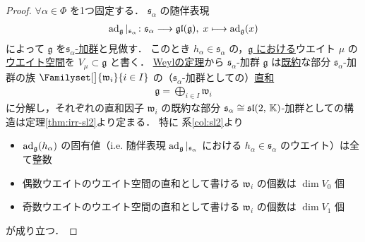 \documentclass[rep_main]{subfiles}
\begin{document}
\begin{proof}
	$\forall \alpha \in \Phi$ を1つ固定する．
	$\mathfrak{s}_\alpha$ の随伴表現
	\begin{align}
		\operatorname{ad}_{\mathfrak{g}}|_{\mathfrak{s}_\alpha} \colon \mathfrak{s}_\alpha \longrightarrow \mathfrak{gl} (\mathfrak{g}),\; x \longmapsto \operatorname{ad}_{\mathfrak{g}}(x)
	\end{align}
	によって $\mathfrak{g}$ を\hyperref[ax:g-module]{$\mathfrak{s}_\alpha$-加群}と見做す．
	このとき $h_\alpha \in \mathfrak{s}_\alpha$ の，\underline{$\mathfrak{g}$ における}ウエイト $\mu$ の\hyperref[def:weight-space]{ウエイト空間}を $V_\mu \subset \mathfrak{g}$ と書く．
	\hyperref[thm:Weyl]{Weylの定理}から $\mathfrak{s}_\alpha$-加群 $\mathfrak{g}$ は\hyperref[def:irr]{既約}な部分 $\mathfrak{s}_\alpha$-加群の族 $\Familyset[\big]{\mathfrak{w}_i}{i \in I}$ の（$\mathfrak{s}_\alpha$-加群としての）\hyperref[def:gmod-directsum]{直和}
	\begin{align}
		\label{eq:prop2.5.4-Weyl}
		\mathfrak{g} = \bigoplus_{i \in I} \mathfrak{w}_i
	\end{align}
	に分解し，それぞれの直和因子 $\mathfrak{w}_i$ の既約な部分 $\mathfrak{s}_\alpha \cong \mathfrak{sl}(2,\, \mathbb{K})$-加群としての構造は定理\ref{thm:irr-sl2}より定まる．
	特に
	系\ref{col:sl2}より 
	\begin{itemize}
		\item $\operatorname{ad}_{\mathfrak{g}}(h_\alpha)$ の固有値（i.e. 随伴表現 $\operatorname{ad}_{\mathfrak{g}}|_{\mathfrak{s}_\alpha}$ における $h_\alpha \in \mathfrak{s}_\alpha$ のウエイト）は全て整数
		\item 偶数ウエイトのウエイト空間の直和として書ける $\mathfrak{w}_i$ の個数は $\dim V_0$ 個
		\item 奇数ウエイトのウエイト空間の直和として書ける $\mathfrak{w}_i$ の個数は $\dim V_1$ 個
	\end{itemize}
	が成り立つ．


\end{proof}
\end{document}
